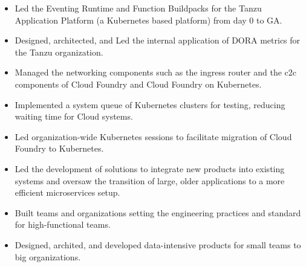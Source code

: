 \documentclass[10pt,a4paper,ragged2e,withhyper]{altacv}
\begin{document}
\begin{paracol}{2}


\begin{itemize}
    \item Led the Eventing Runtime and Function Buildpacks for the Tanzu Application Platform (a Kubernetes based platform) from day 0 to GA.
    \item Designed, architected, and Led the internal application of DORA metrics for the Tanzu organization.
\end{itemize}
\divider

\begin{itemize}
    \item Managed the networking components such as the ingress router and the c2c components of Cloud Foundry and Cloud Foundry on Kubernetes.
    \item Implemented a system queue of Kubernetes clusters for testing, reducing waiting time for Cloud systems.
    \item Led organization-wide Kubernetes sessions to facilitate migration of Cloud Foundry to Kubernetes.
\end{itemize}

\divider

\begin{itemize}
    \item Led the development of solutions to integrate new products into existing systems and oversaw the transition of large, older applications to a more efficient microservices setup.
    \item Built teams and organizations setting the engineering practices and standard for high-functional teams.
\end{itemize}

\divider

\begin{itemize}
    \item Designed, archited, and developed data-intensive products for small teams to big organizations.
\end{itemize}


\end{paracol}
\end{document}
